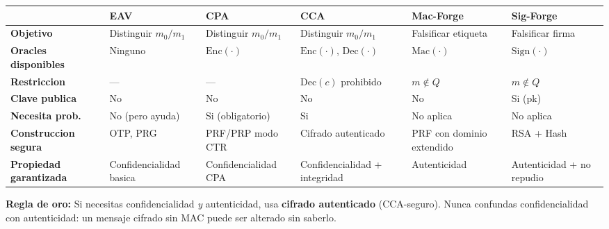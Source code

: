 \documentclass[a4paper,11pt]{article}
\begin{document}
\begin{center}
\renewcommand{\arraystretch}{1.5}
\begin{tabular}{>{\bfseries}p{2.8cm} p{2.5cm} p{2.5cm} p{2.5cm} p{2.5cm} p{2.5cm}}
\toprule
 & \textbf{EAV} & \textbf{CPA} & \textbf{CCA} & \textbf{Mac-Forge} & \textbf{Sig-Forge} \\
\midrule
Objetivo & Distinguir $m_0/m_1$ & Distinguir $m_0/m_1$ & Distinguir $m_0/m_1$ & Falsificar etiqueta & Falsificar firma \\
\addlinespace
Oracles disponibles & Ninguno & $\mathrm{Enc}(\cdot)$ & $\mathrm{Enc}(\cdot)$, $\mathrm{Dec}(\cdot)$ & $\mathrm{Mac}(\cdot)$ & $\mathrm{Sign}(\cdot)$ \\
\addlinespace
Restriccion & --- & --- & $\mathrm{Dec}(c) $ prohibido & $m \notin Q$ & $m \notin Q$ \\
\addlinespace
Clave publica & No & No & No & No & Si (pk) \\
\addlinespace
Necesita prob. & No (pero ayuda) & Si (obligatorio) & Si & No aplica & No aplica \\
\addlinespace
Construccion segura & OTP, PRG & PRF/PRP modo CTR & Cifrado autenticado & PRF con dominio extendido & RSA + Hash \\
\addlinespace
Propiedad garantizada & Confidencialidad basica & Confidencialidad CPA & Confidencialidad + integridad & Autenticidad & Autenticidad + no repudio \\
\bottomrule
\end{tabular}
\end{center}

\vspace{1cm}

\begin{tcolorbox}[
  enhanced,
  colback=darkBg,
  colframe=darkBg,
  sharp corners,
  halign=center,
]
{\color{itbaBlue}\bfseries Regla de oro:} {\color{white}Si necesitas confidencialidad \emph{y} autenticidad, usa \textbf{cifrado autenticado} (CCA-seguro). Nunca confundas confidencialidad con autenticidad: un mensaje cifrado sin MAC puede ser alterado sin saberlo.}
\end{tcolorbox}
\end{document}

